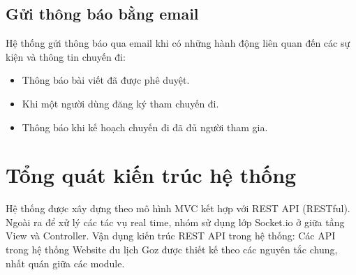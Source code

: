 \subsection{Gửi thông báo bằng email}
Hệ thống gửi thông báo qua email khi có những hành động liên quan đến các sự kiện và thông tin chuyến đi:
\begin{itemize}
    \item Thông báo bài viết đã được phê duyệt.
    \item Khi một người dùng đăng ký tham chuyến đi. 
    \item Thông báo khi kế hoạch chuyến đi đã đủ người tham gia.
\end{itemize}
\section{Tổng quát kiến trúc hệ thống}
\indent 
    Hệ thống được xây dựng theo mô hình MVC kết hợp với REST API (RESTful). Ngoài ra để xử lý các tác vụ real time, nhóm sử dụng lớp Socket.io ở giữa tầng View và Controller.
Vận dụng kiến trúc REST API trong hệ thống:
Các API trong hệ thống Website du lịch Goz được thiết kế theo các nguyên tắc chung, nhất quán giữa các module.
